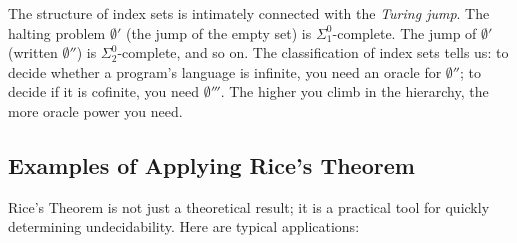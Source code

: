 The structure of index sets is intimately connected with the \emph{Turing jump}. The halting problem $\emptyset'$ (the jump of the empty set) is $\Sigma^0_1$-complete. The jump of $\emptyset'$ (written $\emptyset''$) is $\Sigma^0_2$-complete, and so on. The classification of index sets tells us: to decide whether a program's language is infinite, you need an oracle for $\emptyset''$; to decide if it is cofinite, you need $\emptyset'''$. The higher you climb in the hierarchy, the more oracle power you need.

\subsection{Examples of Applying Rice's Theorem}
\label{sec:rice:examples}

Rice's Theorem is not just a theoretical result; it is a practical tool for quickly determining undecidability. Here are typical applications:

